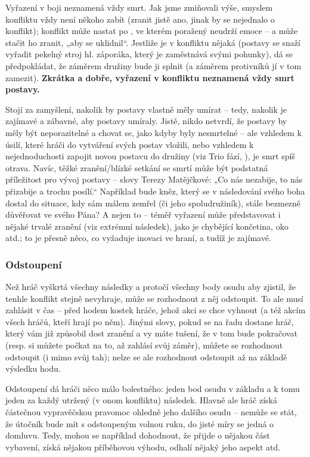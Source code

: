 \documentclass[../main.tex]{subfiles}
\begin{document}
Vyřazení v boji neznamená vždy smrt. Jak jsme zmiňovali výše, smyslem konfliktu vždy není
někoho zabít (zranit jistě ano, jinak by se nejednalo o konflikt); konflikt může nastat
po , ve kterém poražený neudrží emoce – a může stačit ho zranit, „aby se
uklidnil“. Jestliže je v konfliktu nějaká  (postavy se snaží vyřadit pekelný
stroj hl. záporáka, který je zaměstnává svými pohunky), dá se předpokládat, že záměrem
družiny bude ji splnit (a záměrem protivníků jí v tom zamezit). \textbf{Zkrátka a dobře,
vyřazení v konfliktu neznamená vždy smrt postavy.}

Stojí za zamyšlení, nakolik by postavy vlastně měly umírat – tedy, nakolik je zajímavé a
zábavné, aby postavy umíraly. Jistě, nikdo netvrdí, že postavy by měly být neporazitelné
a chovat se, jako kdyby byly nesmrtelné – ale vzhledem k úsilí, které hráči do vytváření
svých postav vložili, nebo vzhledem k nejednoduchosti zapojit novou postavu do družiny
(viz Trio fází, ), je smrt spíš otrava. Navíc, těžké zranění/blízké
setkání se smrtí může být podstatná příležitost pro vývoj postavy – slovy Terezy
Matějčkové: „Co nás nezabije, to nás přizabije a trochu posílí.“ Například bude kněz,
který se v následování svého boha dostal do situace, kdy sám málem zemřel (či jeho
spoludružiník), stále bezmezně důvěřovat ve svého Pána? A nejen to – téměř vyřazení může
představovat i nějaké trvalé zranění (viz extrémní následek), jako je chybějící
končetina, oko atd.; to je přesně něco, co vyžaduje inovaci ve hraní, a tudíž je zajímavé.
\subsubsection{Odstoupení}
\label{sec:odstoupeni}

Než hráč vyškrtá všechny následky a protočí všechny body osudu aby zjistil, že tenhle
konflikt stejně nevyhraje, může se rozhodnout z něj odstoupit. To ale musí zahlásit v čas
– před hodem kostek hráče, jehož akci se chce vyhnout (a též akcím všech hráčů, kteří
hrají po něm). Jinými slovy, pokud se na řadu dostane hráč, který vám již způsobil dost
zranění a vy máte tušení, že v tom bude pokračovat (resp. si můžete počkat na to, až
zahlásí svůj záměr), můžete se rozhodnout odstoupit (i mimo svůj tah); nelze se ale
rozhodnout odstoupit až na základě výsledku hodu.

Odstoupení dá hráči něco málo bolestného: jeden bod osudu v základu a k tomu jeden za
každý utržený (v onom konfliktu) následek. Hlavně ale hráč získá částečnou vypravěčskou
pravomoc ohledně jeho dalšího osudu – nemůže se stát, že útočník bude mít s odstoupeným
volnou ruku, do jisté míry se jedná o domluvu. Tedy, mohou se například dohodnout, že
přijde o nějakou část vybavení, získá nějakou příběhovou výhodu, odhalí nějaký jeho aspekt atd.
\end{document}
